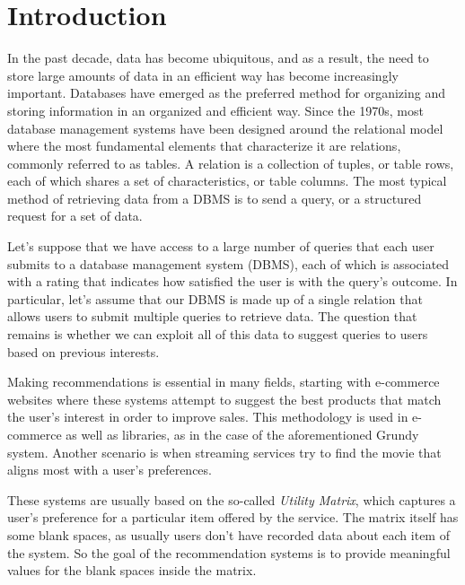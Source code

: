 \section{Introduction}

In the past decade, data has become ubiquitous, and as a result, the need to store large amounts of data in an efficient way has become increasingly important. Databases have emerged as the preferred method for organizing and storing information in an organized and efficient way. Since the 1970s, most database management systems have been designed around the relational model\cite{relational_model} where the most fundamental elements that characterize it are relations, commonly referred to as tables. A relation is a collection of tuples, or table rows, each of which shares a set of characteristics, or table columns. The most typical method of retrieving data from a DBMS is to send a query, or a structured request for a set of data. 

Let's suppose that we have access to a large number of queries that each user submits to a database management system (DBMS), each of which is associated with a rating that indicates how satisfied the user is with the query's outcome. In particular, let's assume that our DBMS is made up of a single relation that allows users to submit multiple queries to retrieve data. The question that remains is whether we can exploit all of this data to suggest queries to users based on previous interests. 

Making recommendations is essential in many fields, starting with e-commerce websites where these systems attempt to suggest the best products that match the user's interest in order to improve sales. This methodology is used in e-commerce as well as libraries, as in the case of the aforementioned Grundy system. Another scenario is when streaming services try to find the movie that aligns most with a user's preferences.

These systems are usually based on the so-called \emph{Utility Matrix}, which captures a user's preference for a particular item offered by the service. The matrix itself has some blank spaces, as usually users don't have recorded data about each item of the system. So the goal of the recommendation systems is to provide meaningful values for the blank spaces inside the matrix.


